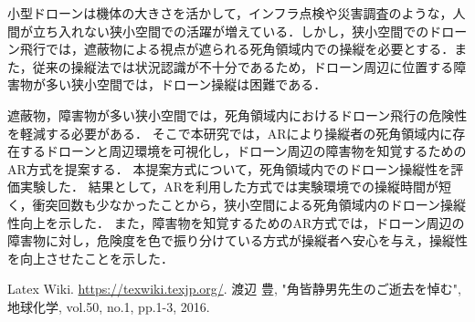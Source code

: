 \documentclass[a4paper,10pt,twocolumn,uplatex]{jsarticle}
\begin{document}
小型ドローンは機体の大きさを活かして，インフラ点検や災害調査のような，人間が立ち入れない狭小空間での活躍が増えている．しかし，狭小空間でのドローン飛行では，遮蔽物による視点が遮られる死角領域内での操縦を必要とする．また，従来の操縦法では状況認識が不十分であるため，ドローン周辺に位置する障害物が多い狭小空間では，ドローン操縦は困難である．\par
遮蔽物，障害物が多い狭小空間では，死角領域内におけるドローン飛行の危険性を軽減する必要がある．
そこで本研究では，ARにより操縦者の死角領域内に存在するドローンと周辺環境を可視化し，ドローン周辺の障害物を知覚するためのAR方式を提案する．
本提案方式について，死角領域内でのドローン操縦性を評価実験した．
結果として，ARを利用した方式では実験環境での操縦時間が短く，衝突回数も少なかったことから，狭小空間による死角領域内のドローン操縦性向上を示した．
また，障害物を知覚するためのAR方式では，ドローン周辺の障害物に対し，危険度を色で振り分けている方式が操縦者へ安心を与え，操縦性を向上させたことを示した．

\footnotesize{
  \begin{thebibliography}{99}
     Latex Wiki. \url{https://texwiki.texjp.org/}.
     渡辺 豊, "角皆静男先生のご逝去を悼む", 地球化学, vol.50, no.1, pp.1-3, 2016.
  \end{thebibliography}
}

% 
% 

\end{document}
